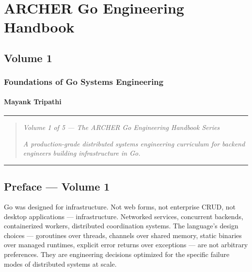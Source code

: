 \documentclass[
]{article}
\author{}
\date{}
\begin{document}
\hypertarget{archer-go-engineering-handbook}{%
\section{ARCHER Go Engineering
Handbook}\label{archer-go-engineering-handbook}}

\hypertarget{volume-1}{%
\subsection{Volume 1}\label{volume-1}}

\hypertarget{foundations-of-go-systems-engineering}{%
\subsubsection{Foundations of Go Systems
Engineering}\label{foundations-of-go-systems-engineering}}

\hypertarget{mayank-tripathi}{%
\paragraph{Mayank Tripathi}\label{mayank-tripathi}}

\begin{center}\rule{0.5\linewidth}{0.5pt}\end{center}

\begin{quote}
\emph{Volume 1 of 5 --- The ARCHER Go Engineering Handbook Series}

\emph{A production-grade distributed systems engineering curriculum for
backend engineers building infrastructure in Go.}
\end{quote}

\begin{center}\rule{0.5\linewidth}{0.5pt}\end{center}

\hypertarget{preface-volume-1}{%
\subsection{Preface --- Volume 1}\label{preface-volume-1}}

Go was designed for infrastructure. Not web forms, not enterprise CRUD,
not desktop applications --- infrastructure. Networked services,
concurrent backends, containerized workers, distributed coordination
systems. The language's design choices --- goroutines over threads,
channels over shared memory, static binaries over managed runtimes,
explicit error returns over exceptions --- are not arbitrary
preferences. They are engineering decisions optimized for the specific
failure modes of distributed systems at scale.
\end{document}
